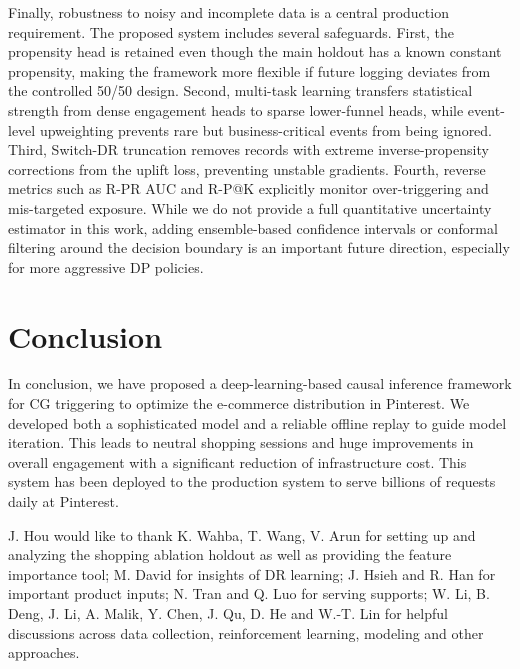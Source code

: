 \documentclass[sigconf, authorversion]{acmart}
\begin{document}
Finally, robustness to noisy and incomplete data is a central production requirement. The proposed system includes several safeguards. First, the propensity head is retained even though the main holdout has a known constant propensity, making the framework more flexible if future logging deviates from the controlled 50/50 design. Second, multi-task learning transfers statistical strength from dense engagement heads to sparse lower-funnel heads, while event-level upweighting prevents rare but business-critical events from being ignored. Third, Switch-DR truncation removes records with extreme inverse-propensity corrections from the uplift loss, preventing unstable gradients. Fourth, reverse metrics such as R-PR AUC and R-P@K explicitly monitor over-triggering and mis-targeted exposure. While we do not provide a full quantitative uncertainty estimator in this work, adding ensemble-based confidence intervals or conformal filtering around the decision boundary is an important future direction, especially for more aggressive DP policies.


\section{Conclusion}
In conclusion, we have proposed a deep-learning-based causal inference framework for CG triggering to optimize the e-commerce distribution in Pinterest. We developed both a sophisticated model and a reliable offline replay to guide model iteration. This leads to neutral shopping sessions and huge improvements in overall engagement with a significant reduction of infrastructure cost. This system has been deployed to the production system to serve billions of requests daily at Pinterest.

\begin{acks}
J. Hou would like to thank K. Wahba, T. Wang, V. Arun for setting up and analyzing the shopping ablation holdout as well as providing the feature importance tool; M. David for insights of DR learning; J. Hsieh and R. Han for important product inputs; N. Tran and Q. Luo for serving supports; W. Li, B. Deng, J. Li, A. Malik, Y. Chen, J. Qu, D. He and W.-T. Lin for helpful discussions across data collection, reinforcement learning, modeling and other approaches.
\end{acks}


\balance





\end{document}
